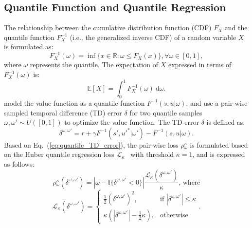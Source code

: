 \documentclass[twoside,11pt]{article}
\newcommand{\state}{s}
\newcommand{\action}{u}
\newcommand{\reward}{r}
\newcommand{\tderror}{\delta}
\newcommand{\huberloss}{\mathcal{L}_\kappa}
\newcommand{\asymmetrichuberloss}{\rho}
\newcommand{\quantilefunction}{F^{-1}}
\newcommand{\quantile}{\omega}
\newcommand{\cdf}{F}
\begin{document}
\subsection{Quantile Function and Quantile Regression}
\label{subsec:background_quantile_function_and_quantile_regression}

The relationship between the cumulative distribution function (CDF) $F_X$ and the quantile function $\quantilefunction_X$ (i.e., the generalized inverse CDF) of a random variable $X$ is formulated as:
\begin{equation}
\quantilefunction_X(\quantile{})=\inf\{x\in\mathbb{R}:\quantile{}\le \cdf{}_X(x)\}, \forall\quantile\in[0,1],
\label{eq:quantile_function_to_inverse_cdf}
\end{equation}
where $\quantile$ represents the quantile. The expectation of $X$ expressed in terms of $\quantilefunction_X(\quantile{})$ is:
\begin{equation}
\mathbb{E}[X]=\int_0^1\quantilefunction_X(\quantile{})\ \mathrm{d}\quantile.
\label{eq:expectation_of_quantile_function}
\end{equation}
\cite{Dabney2018IQN} model the value function as a quantile function $\quantilefunction{}(\state{},\action{}\vert\quantile{})$,
and use a pair-wise sampled temporal difference (TD) error $\tderror$ for two quantile samples $\quantile{}, \quantile{}'\sim U([0,1])$ to optimize the value function. The TD error $\tderror$
is defined as:
\begin{equation}
\label{eq:quantile_TD_error}
\tderror^{\quantile{},\quantile{}'}=\reward+\gamma \quantilefunction{}(\state{}',\action{}'^*\vert\quantile{}') - \quantilefunction{}(\state{},\action{}\vert\quantile{}).
\end{equation}
Based on Eq.~(\ref{eq:quantile_TD_error}), the pair-wise loss $\asymmetrichuberloss{}^\kappa_{\quantile{}}$ is formulated based on the Huber quantile regression loss $\huberloss{}$~\citep{Dabney2018QR-DQN} with threshold $\kappa=1$, and is expressed as follows:
\begin{equation}
\asymmetrichuberloss{}^\kappa_{\quantile{}}(\tderror^{\quantile{},\quantile{}'})=|\quantile{}-\mathbb{I}\{\tderror^{\quantile{},\quantile{}'}<0\}|\frac{\huberloss{}(\tderror^{\quantile{},\quantile{}'})}{\kappa} \text{, where}
\end{equation}
\begin{equation}
\huberloss{}(\tderror^{\quantile{},\quantile{}'})=
\begin{cases}
    \frac{1}{2}(\tderror^{\quantile{},\quantile{}'})^2, & \text{if }|\tderror^{\quantile{},\quantile{}'}|\le\kappa\\
    \kappa(|\tderror^{\quantile{},\quantile{}'}|-\frac{1}{2}\kappa), & \text{otherwise}
\end{cases}.
\end{equation}
\end{document}
